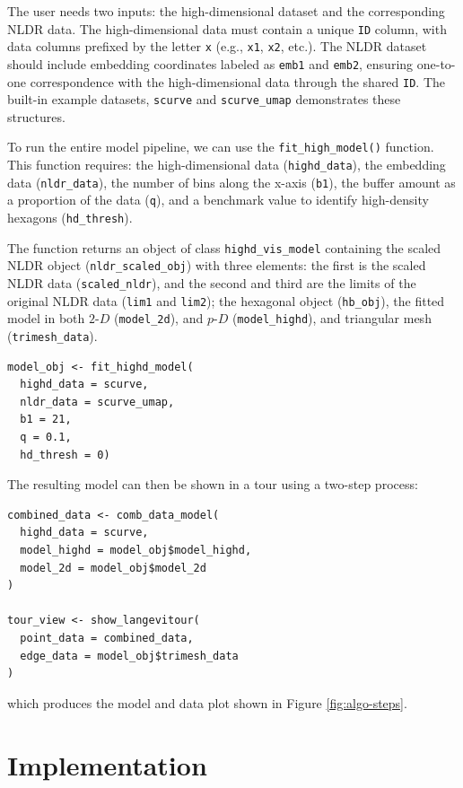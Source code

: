The user needs two inputs: the high-dimensional dataset and the corresponding NLDR data. The high-dimensional data must contain a unique \texttt{ID} column, with data columns prefixed by the letter \texttt{x} (e.g., \texttt{x1}, \texttt{x2}, etc.). The NLDR dataset should include embedding coordinates labeled as \texttt{emb1} and \texttt{emb2}, ensuring one-to-one correspondence with the high-dimensional data through the shared \texttt{ID}. The built-in example datasets, \texttt{scurve} and \texttt{scurve\_umap} demonstrates these structures.

To run the entire model pipeline, we can use the \texttt{fit\_high\_model()} function. This function requires: the high-dimensional data (\texttt{highd\_data}), the embedding data (\texttt{nldr\_data}), the number of bins along the x-axis (\texttt{b1}), the buffer amount as a proportion of the data (\texttt{q}), and a benchmark value to identify high-density hexagons (\texttt{hd\_thresh}).

The function returns an object of class \texttt{highd\_vis\_model} containing the scaled NLDR object (\texttt{nldr\_scaled\_obj}) with three elements: the first is the scaled NLDR data (\texttt{scaled\_nldr}), and the second and third are the limits of the original NLDR data (\texttt{lim1} and \texttt{lim2}); the hexagonal object (\texttt{hb\_obj}), the fitted model in both \(2\text{-}D\) (\texttt{model\_2d}), and \(p\text{-}D\) (\texttt{model\_highd}), and triangular mesh (\texttt{trimesh\_data}).

\begin{verbatim}
model_obj <- fit_highd_model(
  highd_data = scurve, 
  nldr_data = scurve_umap, 
  b1 = 21, 
  q = 0.1, 
  hd_thresh = 0)
\end{verbatim}

The resulting model can then be shown in a tour using a two-step process:

\begin{verbatim}
combined_data <- comb_data_model(
  highd_data = scurve,
  model_highd = model_obj$model_highd,
  model_2d = model_obj$model_2d
)

tour_view <- show_langevitour(
  point_data = combined_data,
  edge_data = model_obj$trimesh_data
)
\end{verbatim}

which produces the model and data plot shown in Figure \ref{fig:algo-steps}.

\section{Implementation}\label{implementation}

